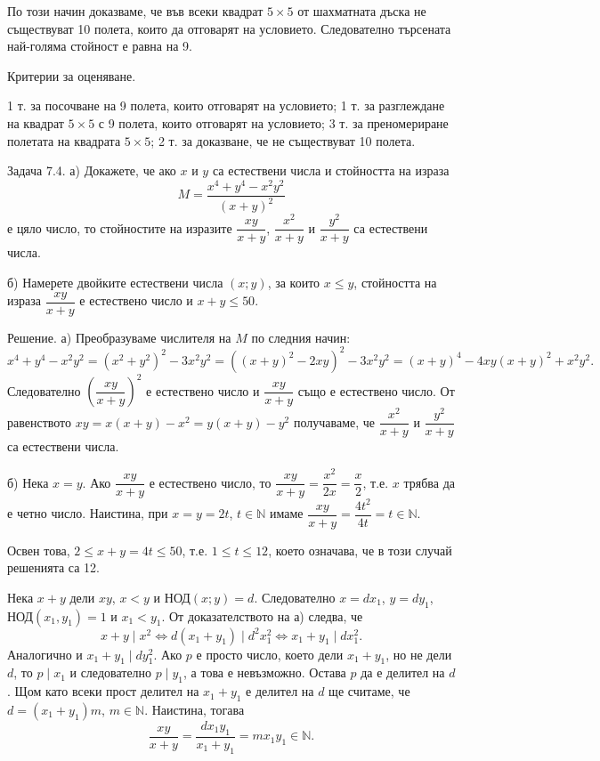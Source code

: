 По този начин доказваме, че във всеки квадрат $5\times5$ от шахматната дъска не съществуват 10 полета, които да отговарят на условието. Следователно търсената най-голяма стойност е равна на 9.

Критерии за оценяване.

1 т. за посочване на 9 полета, които отговарят на условието; 1 т. за разглеждане на квадрат $5\times5$ с 9 полета, които отговарят на условието; 3 т. за преномериране полетата на квадрата $5\times5$; 2 т. за доказване, че не съществуват 10 полета.

Задача 7.4. а) Докажете, че ако $x$ и $y$ са естествени числа и стойността на израза
$$
M=\frac{x^{4}+y^{4}-x^{2}y^{2}}{(x+y)^{2}}
$$
е цяло число, то стойностите на изразите $\dfrac{xy}{x+y}$, $\dfrac{x^{2}}{x+y}$ и $\dfrac{y^{2}}{x+y}$ са естествени числа.

б) Намерете двойките естествени числа $(x;y)$, за които $x\leq y$, стойността на израза $\dfrac{xy}{x+y}$ е естествено число и $x+y\leq50$.

Решение. а) Преобразуваме числителя на $M$ по следния начин:
$$
x^{4}+y^{4}-x^{2}y^{2}=\left(x^{2}+y^{2}\right)^{2}-3x^{2}y^{2}=\left((x+y)^{2}-2xy\right)^{2}-3x^{2}y^{2}=(x+y)^{4}-4xy(x+y)^{2}+x^{2}y^{2}.
$$
Следователно $\left(\dfrac{xy}{x+y}\right)^{2}$ е естествено число и $\dfrac{xy}{x+y}$ също е естествено число. От равенството $xy=x(x+y)-x^{2}=y(x+y)-y^{2}$ получаваме, че $\dfrac{x^{2}}{x+y}$ и $\dfrac{y^{2}}{x+y}$ са естествени числа.

б) Нека $x=y$. Ако $\dfrac{xy}{x+y}$ е естествено число, то $\dfrac{xy}{x+y}=\dfrac{x^{2}}{2x}=\dfrac{x}{2}$, т.е. $x$ трябва да е четно число. Наистина, при $x=y=2t$, $t\in\mathbb{N}$ имаме $\dfrac{xy}{x+y}=\dfrac{4t^{2}}{4t}=t\in\mathbb{N}$.

Освен това, $2\leq x+y=4t\leq50$, т.е. $1\leq t\leq12$, което означава, че в този случай решенията са 12.

Нека $x+y$ дели $xy$, $x<y$ и НОД$(x;y)=d$. Следователно $x=dx_{1}$, $y=dy_{1}$, НОД$(x_{1},y_{1})=1$ и $x_{1}<y_{1}$. От доказателството на а) следва, че
$$
x+y\mid x^{2}\Longleftrightarrow d(x_{1}+y_{1})\mid d^{2}x_{1}^{2}\Longleftrightarrow x_{1}+y_{1}\mid dx_{1}^{2}.
$$
Аналогично и $x_{1}+y_{1}\mid dy_{1}^{2}$. Ако $p$ е просто число, което дели $x_{1}+y_{1}$, но не дели $d$, то $p\mid x_{1}$ и следователно $p\mid y_{1}$, а това е невъзможно. Остава $p$ да е делител на $d$. Щом като всеки прост делител на $x_{1}+y_{1}$ е делител на $d$ ще считаме, че $d=(x_{1}+y_{1})m$, $m\in\mathbb{N}$. Наистина, тогава
$$
\frac{xy}{x+y}=\frac{dx_{1}y_{1}}{x_{1}+y_{1}}=mx_{1}y_{1}\in\mathbb{N}.
$$


